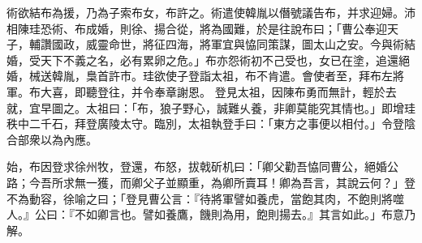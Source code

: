 \begin{pinyinscope}
 
術欲結布為援，乃為子索布女，布許之。術遣使韓胤以僭號議告布，并求迎婦。沛相陳珪恐術、布成婚，則徐、揚合從，將為國難，於是往說布曰；「曹公奉迎天子，輔讚國政，威靈命世，將征四海，將軍宜與恊同策謀，圖太山之安。今與術結婚，受天下不義之名，必有累卵之危。」布亦怨術初不己受也，女已在塗，追還絕婚，械送韓胤，梟首許市。珪欲使子登詣太祖，布不肯遣。會使者至，拜布左將軍。布大喜，即聽登往，并令奉章謝恩。
 登見太祖，因陳布勇而無計，輕於去就，宜早圖之。太祖曰：「布，狼子野心，誠難乆養，非卿莫能究其情也。」即增珪秩中二千石，拜登廣陵太守。臨別，太祖執登手曰：「東方之事便以相付。」令登陰合部衆以為內應。
 
 
 
 
 始，布因登求徐州牧，登還，布怒，拔戟斫机曰：「卿父勸吾恊同曹公，絕婚公路；今吾所求無一獲，而卿父子並顯重，為卿所賣耳！卿為吾言，其說云何？」登不為動容，徐喻之曰；「登見曹公言：『待將軍譬如養虎，當飽其肉，不飽則將噬人。』公曰：『不如卿言也。譬如養鷹，饑則為用，飽則揚去。』其言如此。」布意乃解。
 

\end{pinyinscope}

